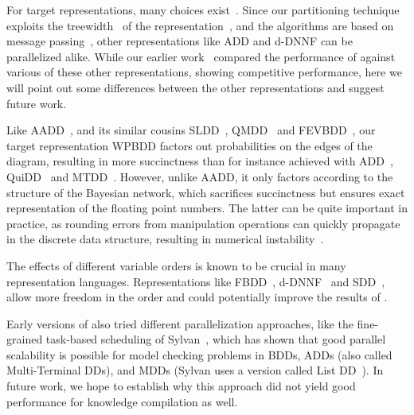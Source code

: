 For target representations, many choices exist~\cite{chavira2008probabilistic,darwiche2011sdd,choi2022fpga}. Since our partitioning technique exploits the treewidth~\cite{chen2022definition} of the representation~\cite[\S 5]{dal2021compositional}, and the algorithms are based on message passing~\cite[\S 4]{dal2021compositional}, other representations like ADD and d-DNNF can be parallelized alike. While our earlier work~\cite{dal2018parallel} compared the performance of \toolname against various of these other representations, showing competitive performance, here we will point out some differences between the other representations and suggest future work.


Like AADD~\cite{sanner2005affine}, and its similar cousins SLDD~\cite{wilson2005decision}, QMDD~\cite{miller2006qmdd} and FEVBDD~\cite{tafertshofer1997factored}, our target representation WPBDD factors out probabilities on the edges of the diagram, resulting in more succinctness than for instance achieved with ADD~\cite{bahar}, QuiDD~\cite{viamontes2003improving} and MTDD~\cite{Clarke2001}. However, unlike AADD, it only factors according to the structure of the Bayesian network, which sacrifices succinctness but ensures exact representation of the floating point numbers. The latter can be quite important in practice, as rounding errors from manipulation operations can quickly propagate in the discrete data structure, resulting in numerical instability~\cite{hillmich2022reordering}.

The effects of different variable orders is known to be crucial in many representation languages. Representations like FBDD~\cite{wegener2000branching}, d-DNNF~\cite{chavira2008probabilistic} and SDD~\cite{darwiche2011sdd}, allow more freedom in the order and could potentially improve the results of \toolname.

Early versions of \toolname also tried different parallelization approaches, like the fine-grained task-based scheduling of Sylvan~\cite{van2013multi}, which has shown that good parallel scalability is possible for model checking problems in BDDs, ADDs (also called Multi-Terminal DDs), and MDDs (Sylvan uses a version called List DD~\cite{sylvan-journal}). In future work, we hope to establish why this approach did not yield good performance for knowledge compilation as well.




